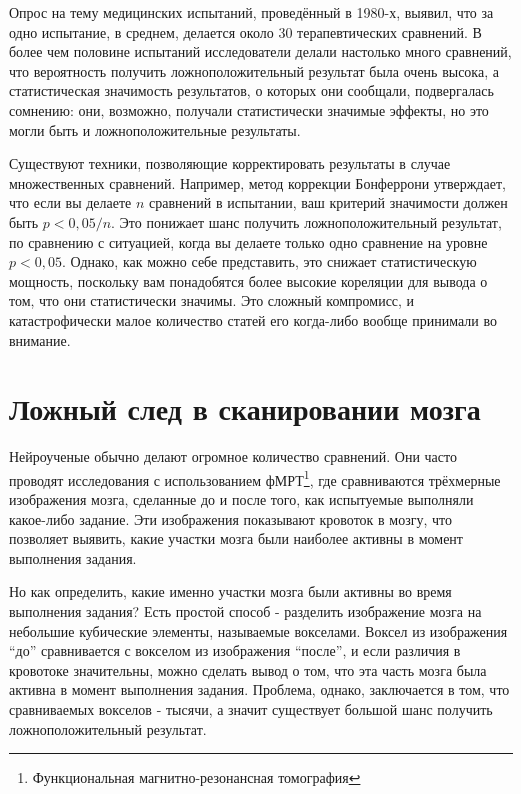 Опрос на тему медицинских испытаний, проведённый в 1980-х, выявил, что за одно испытание, в среднем, делается около 30 терапевтических сравнений. В более чем половине испытаний исследователи делали настолько много сравнений, что вероятность получить ложноположительный результат была очень высока, а статистическая значимость результатов, о которых они сообщали, подвергалась сомнению: они, возможно, получали статистически значимые эффекты, но это могли быть и ложноположительные результаты.\cite{smith_impact_1987}

Существуют техники, позволяющие корректировать результаты в случае множественных сравнений. Например, метод коррекции Бонферрони утверждает, что если вы делаете $n$ сравнений в испытании, ваш критерий значимости должен быть $p < 0,05/n$. Это понижает шанс получить ложноположительный результат, по сравнению с ситуацией, когда вы делаете только одно сравнение на уровне $p < 0,05$. Однако, как можно себе представить, это снижает статистическую мощность, поскольку вам понадобятся более высокие кореляции для вывода о том, что они статистически значимы. Это сложный компромисс, и катастрофически малое количество статей его когда-либо вообще принимали во внимание.


\section{Ложный след в сканировании мозга} %
\label{chp5:redherrings}

Нейроученые обычно делают огромное количество сравнений. Они часто проводят исследования с использованием фМРТ\footnote{Функциональная магнитно-резонансная томография}, где сравниваются трёхмерные изображения мозга, сделанные до и после того, как испытуемые выполняли какое-либо задание. Эти изображения показывают кровоток в мозгу, что позволяет выявить, какие участки мозга были наиболее активны в момент выполнения задания.

Но как определить, какие именно участки мозга были активны во время выполнения задания? Есть простой способ - разделить изображение мозга на небольшие кубические элементы, называемые вокселами. Воксел из изображения ``до'' сравнивается с вокселом из изображения ``после'', и если различия в кровотоке значительны, можно сделать вывод о том, что эта часть мозга была активна в момент выполнения задания. Проблема, однако, заключается в том, что сравниваемых вокселов - тысячи, а значит существует большой шанс получить ложноположительный результат.

